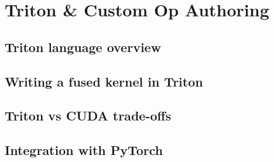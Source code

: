 
\section{Triton \& Custom Op Authoring}

\subsection{Triton language overview}


\subsection{Writing a fused kernel in Triton}


\subsection{Triton vs CUDA trade-offs}


\subsection{Integration with PyTorch}


